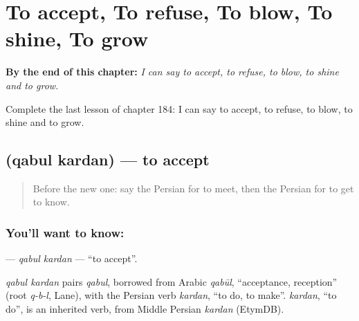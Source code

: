 
\chapter{To accept, To refuse, To blow, To shine, To grow}
\label{ch:fa-to-accept-to-refuse-to-blow-to-shine-to-grow}

\begin{chapteropening}
\textbf{By the end of this chapter:} \emph{I can say to accept, to refuse, to blow, to shine and to grow.}

Complete the last lesson of chapter 184: I can say to accept, to refuse, to blow, to shine and to grow.
\end{chapteropening}

\section[\texorpdfstring{\fa{قبول} \fa{کردن} (qabul kardan)}{قبول کردن (qabul kardan)}]{  (qabul kardan) — to accept}

\label{lesson:FA-C184-qabul-kardan}



\begin{quote}
Before the new one: say the Persian for to meet, then the Persian for to get to know.
\end{quote}

\subsection*{You'll want to know:  }
\textbf{ } — \emph{qabul kardan} — \textquotedblleft{}to accept\textquotedblright{}.

\begin{cousinweb}
\emph{qabul kardan} pairs \emph{qabul}, borrowed from Arabic \emph{qabūl}, \textquotedblleft{}acceptance, reception\textquotedblright{} (root \emph{q-b-l}, Lane), with the Persian verb \emph{kardan}, \textquotedblleft{}to do, to make\textquotedblright{}. \emph{kardan}, \textquotedblleft{}to do\textquotedblright{}, is an inherited verb, from Middle Persian \emph{kardan} (EtymDB).
\end{cousinweb}

